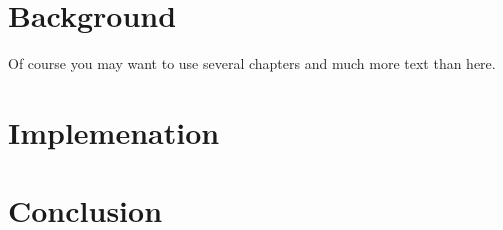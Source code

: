 \documentclass[bsc,frontabs,twoside,singlespacing,parskip,deptreport]{infthesis}
\begin{document}
\chapter{Background}

Of course
you may want to use several chapters and much more text than here.

\chapter{Implemenation}

\chapter{Conclusion}



\end{document}
